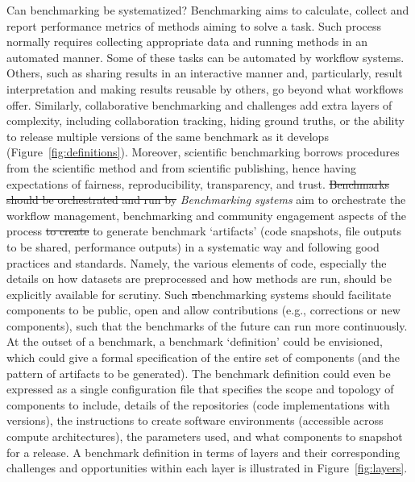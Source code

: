 \documentclass[11pt]{article}
\begin{document}
Can benchmarking be systematized? {\color{red}Benchmarking aims to calculate, collect and report performance metrics of methods aiming to solve a task. Such process normally requires collecting appropriate data and running methods in an automated manner. Some of these tasks can be automated by workflow systems. Others, such as sharing results in an interactive manner and, particularly, result interpretation and making results reusable by others, go beyond what workflows offer. Similarly, collaborative benchmarking and challenges add extra layers of complexity, including collaboration tracking, hiding ground truths, or the ability to release multiple versions of the same benchmark as it develops (Figure~\ref{fig:definitions}). Moreover, scientific benchmarking borrows procedures from the scientific method and from scientific publishing, hence having expectations of fairness, reproducibility, transparency, and trust. 
\sout{Benchmarks should be orchestrated and run by}} \emph{Benchmarking systems} {\color{red} aim to orchestrate the workflow management, benchmarking and community engagement aspects of the process  \sout{to create} to generate benchmark} `artifacts' (code snapshots, file outputs to be shared, performance outputs) {\color{red} in a systematic way and following good practices and standards. Namely,}  the various elements of code, especially the details on how datasets are preprocessed and how methods are run, should be explicitly available for scrutiny. Such {\color{red}\sout{a}benchmarking} systems should facilitate components to be public, open and allow contributions (e.g., corrections or new components), such that the benchmarks of the future can run more continuously. At the outset of a benchmark, a benchmark `definition' could be envisioned, which could give a formal specification of the entire set of components (and the pattern of artifacts to be generated). The benchmark definition could even be expressed as a single configuration file that specifies the scope and topology of components to include, details of the repositories (code implementations with versions), the instructions to create software environments (accessible across compute architectures), the parameters used, and what components to snapshot for a release. A benchmark definition in terms of layers and their corresponding challenges and opportunities within each layer is illustrated in Figure~\ref{fig:layers}.  
\end{document}
